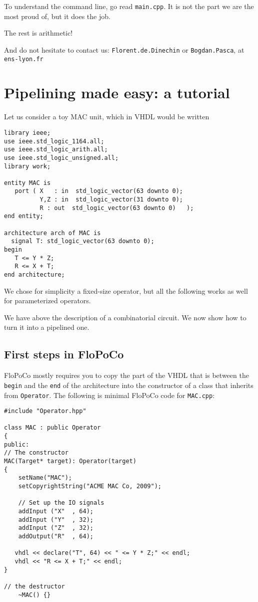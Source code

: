 \documentclass{article}
\begin{document}
To understand the command line, go read \texttt{main.cpp}. It is not
the part we are the most proud of, but it does the job.

The rest is arithmetic!

And do not hesitate to contact us: \texttt{Florent.de.Dinechin} or
\texttt{Bogdan.Pasca}, at \texttt{ens-lyon.fr}



\section{Pipelining made easy: a tutorial}
\label{sec:pme}

Let us consider a toy MAC unit, which in VHDL would be written
\begin{verbatim}
library ieee;
use ieee.std_logic_1164.all;
use ieee.std_logic_arith.all;
use ieee.std_logic_unsigned.all;
library work;

entity MAC is
   port ( X   : in  std_logic_vector(63 downto 0);
          Y,Z : in  std_logic_vector(31 downto 0);
          R : out  std_logic_vector(63 downto 0)   );
end entity;

architecture arch of MAC is
  signal T: std_logic_vector(63 downto 0);
begin
   T <= Y * Z;
   R <= X + T;
end architecture;
\end{verbatim}
We chose for simplicity a fixed-size operator, but all the following
works as well for parameterized operators.

We have above  the description of
a combinatorial circuit. We now show how to turn it into a pipelined
one.


\subsection{First steps in FloPoCo}

FloPoCo mostly requires you to copy the part of the VHDL that is
between the \texttt{begin} and the \texttt{end} of the architecture
into the constructor of a class that inherits from
\verb!Operator!. The following is minimal FloPoCo code for
\verb!MAC.cpp!:
\begin{verbatim}
#include "Operator.hpp"

class MAC : public Operator
{
public:
// The constructor
MAC(Target* target): Operator(target)
{
	setName("MAC");
	setCopyrightString("ACME MAC Co, 2009");		

	// Set up the IO signals
	addInput ("X"  , 64);
	addInput ("Y"  , 32);
	addInput ("Z"  , 32);
	addOutput("R"  , 64);

   vhdl << declare("T", 64) << " <= Y * Z;" << endl;
   vhdl << "R <= X + T;" << endl;
}

// the destructor
	~MAC() {}
\end{verbatim}
 
\end{document}
